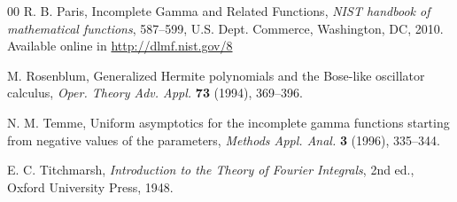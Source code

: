 \documentclass[11pt,a4paper]{amsart}
\theoremstyle{plain}
\theoremstyle{plain}
\theoremstyle{remark}
\numberwithin{equation}{section}
\begin{document}
\begin{thebibliography}{00}
R. B. Paris,
Incomplete Gamma and Related Functions,
\textit{NIST handbook of mathematical functions},
587--599, %
U.S. Dept. Commerce, Washington, DC, 2010.
Available online in \url{http://dlmf.nist.gov/8}

M. Rosenblum,
{Generalized Hermite polynomials and the Bose-like oscillator calculus},
\textit{Oper. Theory Adv. Appl.}
\textbf{73} (1994), 369--396.

N. M. Temme,
Uniform asymptotics for the incomplete gamma functions starting from negative values of the parameters,
\textit{Methods Appl. Anal.}
\textbf{3} (1996), 335--344. %

E. C. Titchmarsh, 
\textit{Introduction to the Theory of Fourier Integrals}, 
2nd ed., Oxford University Press, 1948.



\end{thebibliography}

\end{document}
